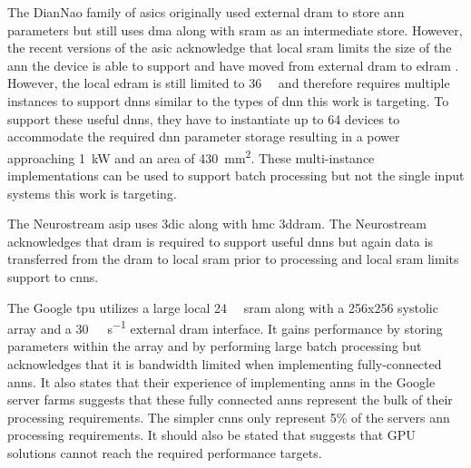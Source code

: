 {{{The DianNao family of \acp{asic} \cite{chen2014diannao} \cite{chen2016diannao} originally used external \ac{dram} to store \ac{ann} parameters but still uses \ac{dma} along with \ac{sram} as an intermediate store.
However, the recent versions of the \ac{asic} acknowledge that local \ac{sram} limits the size of the \ac{ann} the device is able to support and have moved from external \ac{dram} to \ac{edram} \cite{dadiannao2017}.
However, the local \ac{edram} is still limited to \SI[per-mode=symbol]{36}{\mega \byte} and therefore requires multiple instances to support \acp{dnn} similar to the types of \ac{dnn} this work is targeting.
To support these useful \acp{dnn}, they have to instantiate up to 64 devices to accommodate the required \ac{dnn} parameter storage resulting in a power approaching \SI[per-mode=symbol]{1}{\kilo\watt} and an area of \SI[per-mode=symbol]{430}{\mm\squared}.
These multi-instance implementations can be used to support batch processing \cite{dadiannao2017} but not the single input systems this work is targeting.

The Neurostream \ac{asip} uses \ac{3dic} along with \ac{hmc} \ac{3ddram}. 
The Neurostream acknowledges that \ac{dram} is required to support useful \acp{dnn} but again data is transferred from the \ac{dram} to local \ac{sram} prior to processing and local \ac{sram} limits support to \acp{cnn}.

The Google \ac{tpu} \cite{tensorflow2015-whitepaper} utilizes a large local \SI[per-mode=symbol]{24}{\mega \byte} \ac{sram} along with a 256x256 systolic array and a \SI[per-mode=symbol]{30}{\giga \byte\per\second} external \ac{dram} interface.
It gains performance by storing parameters within the array and by performing large batch processing but acknowledges that it is bandwidth limited when implementing fully-connected \acp{ann}.
It also states that their experience of implementing \acp{ann} in the Google server farms suggests that these fully connected \acp{ann} represent the bulk of their processing requirements.
The simpler \acp{cnn} only represent 5\% of the servers \ac{ann} processing requirements.
It should also be stated that \cite{tensorflow2015-whitepaper} suggests that GPU solutions cannot reach the required performance targets.


\iffalse
Unlike the current state-of-the-art, this work focuses on processing data as it read out of the \ac{dram} thus avoiding requiring excessive \ac{sram}.
in the \acp{pe} thus allowing optimum logic assignment to the processing functions.
\fi

}}}

